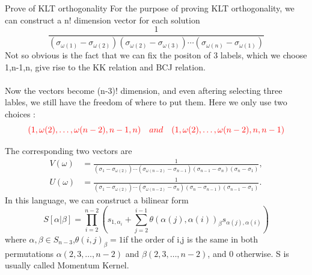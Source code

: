\documentclass{beamer}
\begin{document}
\begin{frame}{Prove of KLT orthogonality}
    For the purpose of proving KLT orthogonality, we can construct a n! dimension vector for each solution
    \begin{equation*}
        \frac1{(\sigma_{\omega(1)}-\sigma_{\omega(2)})(\sigma_{\omega(2)}-\sigma_{\omega(3)})\cdots(\sigma_{\omega(n)}-\sigma_{\omega(1)})}
    \end{equation*}
    Not so obvious is the fact that we can fix the positon of 3 labels, which we choose 1,n-1,n, give rise to the KK relation and BCJ relation.
    \\ \hspace*{\fill}\\
    Now the vectors become (n-3)! dimension, and even aftering selecting three lables, we still have the freedom of where to put them. Here we only use two choices :
    \begin{equation*}
        \textcolor{red}{(1,\omega(2),\dots,\omega(n-2),n-1,n)\quad and \quad (1,\omega(2),\dots,\omega(n-2),n,n-1 )}
    \end{equation*}
\end{frame}
\begin{frame}
    The corresponding two vectors are 
    \begin{align*}V(\omega)&=\frac1{(\sigma_1-\sigma_{\omega(2)})\cdots(\sigma_{\omega(n-2)}-\sigma_{n-1})(\sigma_{n-1}-\sigma_n)(\sigma_n-\sigma_1)},\\U(\omega)&=\frac1{(\sigma_1-\sigma_{\omega(2)})\cdots(\sigma_{\omega(n-2)}-\sigma_n)(\sigma_n-\sigma_{n-1})(\sigma_{n-1}-\sigma_1)}.
    \end{align*}
    In this language, we can construct a bilinear form 
    \begin{equation*}
        S[\alpha|\beta]=\prod^{n-2}_{i=2}\left(s_{1,\alpha_i}+\sum_{j=2}^{i-1}
        \theta(\alpha(j),\alpha(i))_\beta s_{\alpha(j),\alpha(i)}\right)
    \end{equation*}
    where $\alpha,\beta\in S_{n-3}$,$\theta(i,j)_\beta=1$if the order of i,j is the same in both permutations 
    $\alpha(2,3,\dots,n-2)$ and $\beta(2,3,\dots,n-2)$, and 0 otherwise.
    S is usually called \alert{Momentum Kernel}.
\end{frame}
\end{document}
